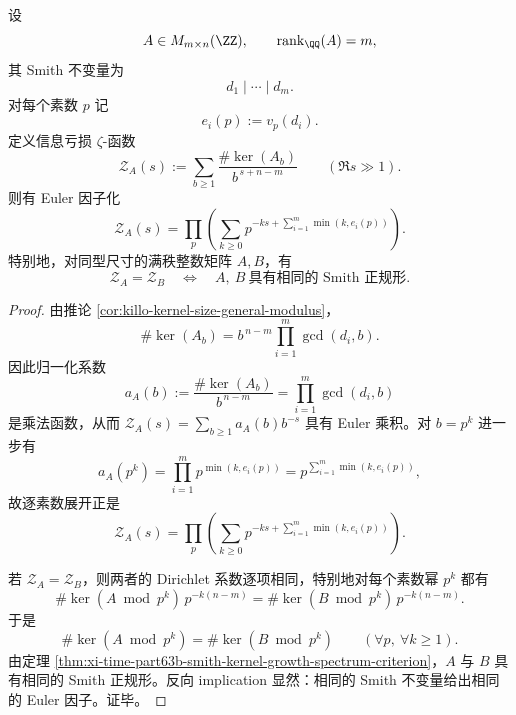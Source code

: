 \begin{theorem}\label{thm:xi-time-part63b-loss-zeta-euler-factorization-smith-rigidity}
设
\[
A\in M_{m\times n}(\ZZ),
\qquad
\operatorname{rank}_{\QQ}(A)=m,
\]
其 Smith 不变量为
\[
d_1\mid\cdots\mid d_m.
\]
对每个素数 \(p\) 记
\[
e_i(p):=v_p(d_i).
\]
定义信息亏损 \(\zeta\)-函数
\[
\mathcal Z_A(s)
:=
\sum_{b\ge 1}\frac{\#\ker(A_b)}{b^{\,s+n-m}}
\qquad(\Re s\gg 1).
\]
则有 Euler 因子化
\[
\mathcal Z_A(s)
=
\prod_p
\left(
\sum_{k\ge 0}
p^{-ks+\sum_{i=1}^{m}\min(k,e_i(p))}
\right).
\]
特别地，对同型尺寸的满秩整数矩阵 \(A,B\)，有
\[
\mathcal Z_A=\mathcal Z_B
\quad\Longleftrightarrow\quad
A,\ B\ \text{具有相同的 Smith 正规形}.
\]
\end{theorem}
\begin{proof}
由推论 \ref{cor:killo-kernel-size-general-modulus}，
\[
\#\ker(A_b)
=
b^{\,n-m}\prod_{i=1}^{m}\gcd(d_i,b).
\]
因此归一化系数
\[
a_A(b):=
\frac{\#\ker(A_b)}{b^{\,n-m}}
=
\prod_{i=1}^{m}\gcd(d_i,b)
\]
是乘法函数，从而 \(\mathcal Z_A(s)=\sum_{b\ge 1}a_A(b)b^{-s}\) 具有 Euler 乘积。对 \(b=p^k\) 进一步有
\[
a_A(p^k)
=
\prod_{i=1}^{m}p^{\min(k,e_i(p))}
=
p^{\sum_{i=1}^{m}\min(k,e_i(p))},
\]
故逐素数展开正是
\[
\mathcal Z_A(s)
=
\prod_p
\left(
\sum_{k\ge 0}
p^{-ks+\sum_{i=1}^{m}\min(k,e_i(p))}
\right).
\]

若 \(\mathcal Z_A=\mathcal Z_B\)，则两者的 Dirichlet 系数逐项相同，特别地对每个素数幂 \(p^k\) 都有
\[
\#\ker(A\bmod p^k)\,p^{-k(n-m)}
=
\#\ker(B\bmod p^k)\,p^{-k(n-m)}.
\]
于是
\[
\#\ker(A\bmod p^k)=\#\ker(B\bmod p^k)
\qquad(\forall p,\ \forall k\ge 1).
\]
由定理 \ref{thm:xi-time-part63b-smith-kernel-growth-spectrum-criterion}，\(A\) 与 \(B\) 具有相同的 Smith 正规形。反向 implication 显然：相同的 Smith 不变量给出相同的 Euler 因子。证毕。
\end{proof}

